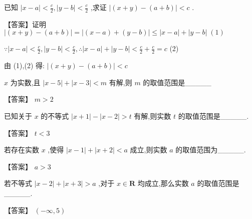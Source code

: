 \documentclass[11pt,a4paper]{article}
\begin{document}
\begin{problem} 

已知 \(\displaystyle \left| {x - a}\right|  < \frac{c}{2},\left| {y - b}\right|  < \frac{c}{2}\) ,求证 \(\displaystyle \left| {\left( {x + y}\right)  - \left( {a + b}\right) }\right|  < c\) .
\begin{jiexi}[35]
【答案】证明 \(\displaystyle \left| {\left( {x + y}\right)  - \left( {a + b}\right) }\right|  = \left| {\left( {x - a}\right)  + \left( {y - b}\right) }\right|  \leq  \left| {x - a}\right|  + \left| {y - b}\right| \;\left( 1\right)\)

\(\displaystyle \because \left| {x - a}\right|  < \frac{c}{2},\left| {y - b}\right|  < \frac{c}{2},\therefore \left| {x - a}\right|  + \left| {y - b}\right|  < \frac{c}{2} + \frac{c}{2} = c\) (2)

由 (1),(2) 得: \(\displaystyle \left| {\left( {x + y}\right)  - \left( {a + b}\right) }\right|  < c\)

\end{jiexi}
\end{problem}
\begin{problem} 
\(\displaystyle x\) 为实数,且 \(\displaystyle \left| {x - 5}\right|  + \left| {x - 3}\right|  < m\) 有解,则 \(\displaystyle m\) 的取值范围是\_\_\_\_\_
\begin{jiexi}
【答案】 \(\displaystyle m > 2\)
\end{jiexi}
\end{problem}
\begin{problem}
已知关于 \(\displaystyle x\) 的不等式 \(\displaystyle \left| {x + 1}\right|  - \left| {x - 2}\right|  > t\) 有解,则实数 \(\displaystyle t\) 的取值范围是\_\_\_\_\_.
\begin{jiexi}
【答案】 \(\displaystyle t < 3\)

\end{jiexi}
\end{problem}
\begin{problem} 
若存在实数 \(\displaystyle x\) ,使得 \(\displaystyle \left| {x - 1}\right|  + \left| {x + 2}\right|  < a\) 成立,则实数 \(\displaystyle a\) 的取值范围为\_\_\_\_\_.
\begin{jiexi}
【答案】 \(\displaystyle a > 3\)

\end{jiexi}
\end{problem}
\begin{problem} 

    若不等式 \(\displaystyle \left| {x - 2}\right|  + \left| {x + 3}\right|  > a\) ,对于 \(\displaystyle x \in  \mathbf{R}\) 均成立,那么实数 \(\displaystyle a\) 的取值范围是\_\_\_\_\_.
    \begin{jiexi}
【答案】 \(\displaystyle \left( {-\infty ,5}\right)\)


\end{jiexi}
\end{problem}
\end{document}
